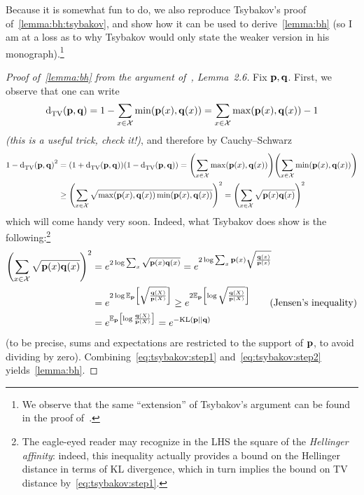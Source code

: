 \documentclass[10pt]{article}
\begin{document}
Because it is somewhat fun to do, we also reproduce Tsybakov's proof of~\autoref{lemma:bh:tsybakov}, and show how it can be used to derive~\autoref{lemma:bh} (so I am at a loss as to why Tsybakov would only state the weaker version in his monograph).\footnote{We observe that the same ``extension'' of Tsybakov's argument can be found in the proof of~\cite[Lemma 6]{GaoHRZ19}.}
\begin{proof}[Proof of~\autoref{lemma:bh} from the argument of~\cite{Tsybakov09}, Lemma~2.6]
Fix $\mathbf{p},\mathbf{q}$. First, we observe that one can write 
\begin{equation}
  \totalvardist{\p}{\q}=1-\sum_{x\in\domain} \min(\p(x),\q(x)) = \sum_{x\in\domain} \max(\p(x),\q(x)) - 1
\end{equation}
\emph{(this is a useful trick, check it!)}, and therefore by Cauchy--Schwarz
\begin{align}
    1-\totalvardist{\p}{\q}^2 
    &= (1+\totalvardist{\p}{\q})(1-\totalvardist{\p}{\q})
    = \mleft(\sum_{x\in\domain} \max(\p(x),\q(x))\mright)\mleft(\sum_{x\in\domain} \min(\p(x),\q(x))\mright) \notag\\
    &\geq \mleft(\sum_{x\in\domain} \sqrt{\max(\p(x),\q(x))\min(\p(x),\q(x))}\mright)^2
    = \mleft(\sum_{x\in\domain} \sqrt{\p(x)\q(x)}\mright)^2 \label{eq:tsybakov:step1}
\end{align}
which will come handy very soon. Indeed, what Tsybakov does show is the following:\footnote{The eagle-eyed reader may recognize in the LHS the square of the \emph{Hellinger affinity}: indeed, this inequality actually provides a bound on the Hellinger distance in terms of KL divergence, which in turn implies the bound on TV distance by~\eqref{eq:tsybakov:step1}.}
\begin{align}
    \mleft(\sum_{x\in\domain} \sqrt{\p(x)\q(x)}\mright)^2
    &= e^{2\log \sum_{x} \sqrt{\p(x)\q(x)}}
    = e^{2\log \sum_{x} \p(x)\sqrt{\frac{\q(x)}{\p(x)}}} \notag\\
    &= e^{2\log \shortexpect_\p\mleft[\sqrt{\frac{\q(X)}{\p(X)}}\mright]} 
    \geq e^{2\shortexpect_\p\mleft[\log \sqrt{\frac{\q(X)}{\p(X)}}\mright]} \tag{Jensen's inequality}\notag\\
    &= e^{\shortexpect_\p\mleft[\log \frac{\q(X)}{\p(X)}\mright]} 
    = e^{-\kldiv{\p}{\q}} \label{eq:tsybakov:step2}
\end{align}
(to be precise, sums and expectations are restricted to the support of $\mathbf{p}$, to avoid dividing by zero). Combining~\eqref{eq:tsybakov:step1} and~\eqref{eq:tsybakov:step2} yields~\autoref{lemma:bh}.
\end{proof}
\end{document}

